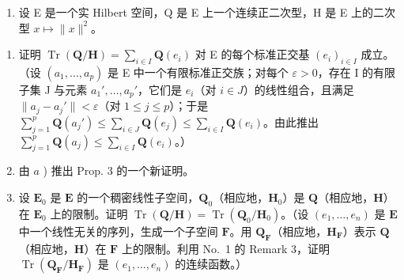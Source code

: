 \begin{enumerate}
\def\labelenumi{\arabic{enumi})}
\setcounter{enumi}{1}
\tightlist
\item
  设 E 是一个实 Hilbert 空间，Q 是 E 上一个连续正二次型，H 是 E 上的二次型 \(x \mapsto \|x\|^2\)。
\end{enumerate}

\begin{enumerate}
\def\labelenumi{\alph{enumi})}
\item
  证明 \(\operatorname{Tr}(\mathbf{Q}/\mathbf{H}) = \sum_{i \in I} \mathbf{Q}(e_i)\) 对 E 的每个标准正交基 \((e_i)_{i \in I}\) 成立。（设 \((a_1, \ldots, a_p)\) 是 E 中一个有限标准正交族；对每个 \(\varepsilon > 0\)，存在 I 的有限子集 J 与元素 \(a_1', \ldots, a_p'\)，它们是 \(e_i\)（对 \(i \in J\)）的线性组合，且满足 \(\|a_j - a_j' \| < \varepsilon\)（对 \(1 \leqslant j \leqslant p\)）；于是 \(\sum_{j=1}^{p} \mathbf{Q}(a_j') \leqslant \sum_{i \in J} \mathbf{Q}(e_j) \leqslant \sum_{i \in I} \mathbf{Q}(e_i)\)。由此推出 \(\sum_{j=1}^{p} \mathbf{Q}(a_j) \leqslant \sum_{i \in I} \mathbf{Q}(e_i)\)。）
\item
  由 \(a\) ) 推出 Prop. 3 的一个新证明。
\item
  设 \(\mathbf{E}_0\) 是 \(\mathbf{E}\) 的一个稠密线性子空间，\(\mathbf{Q}_0\)（相应地，\(\mathbf{H}_0\)）是 \(\mathbf{Q}\)（相应地，\(\mathbf{H}\)）在 \(\mathbf{E}_0\) 上的限制。证明 \(\operatorname{Tr}(\mathbf{Q}/\mathbf{H}) = \operatorname{Tr}(\mathbf{Q}_0/\mathbf{H}_0)\)。（设 \((e_1, \ldots, e_n)\) 是 \(\mathbf{E}\) 中一个线性无关的序列，生成一个子空间 \(\mathbf{F}\)。用 \(\mathbf{Q}_{\mathbf{F}}\)（相应地，\(\mathbf{H}_{\mathbf{F}}\)）表示 \(\mathbf{Q}\)（相应地，\(\mathbf{H}\)）在 \(\mathbf{F}\) 上的限制。利用 No.~1 的 Remark 3，证明 \(\operatorname{Tr}(\mathbf{Q}_{\mathbf{F}}/\mathbf{H}_{\mathbf{F}})\) 是 \((e_1, \ldots, e_n)\) 的连续函数。）
\end{enumerate}

